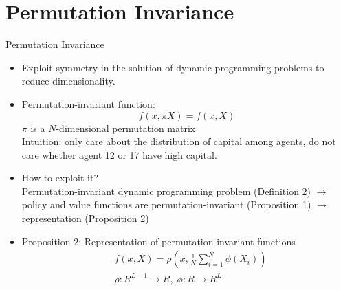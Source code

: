 \documentclass[dvipsnames,mathserif]{beamer}
\begin{document}
{\section{Permutation Invariance}
\begin{frame}{Permutation Invariance}
    \begin{itemize}
        \item Exploit symmetry in the solution of dynamic programming problems to reduce dimensionality.\\
        \vspace{0.2cm}
        \item Permutation-invariant function:
        \[f(x,\pi X) = f(x,X)\]
        $\pi$ is a $N$-dimensional permutation matrix\\
        Intuition: only care about the distribution of capital among agents, do not care whether agent 12 or 17 have high capital.
        \item How to exploit it?\\
        Permutation-invariant dynamic programming problem (Definition 2) $\rightarrow$ policy and value functions are permutation-invariant (Proposition 1) $\rightarrow$ representation (Proposition 2)
        \item Proposition 2: Representation of permutation-invariant functions
        \begin{align*}
        &f(x,X) = \rho(x,\frac{1}{N}\sum_{i=1}^{N}\phi(X_i))\\
        &\rho: R^{L+1} \rightarrow R ,\; \phi: R \rightarrow R^{L}
        \end{align*}
    \end{itemize}
\end{frame}


}
\end{document}
